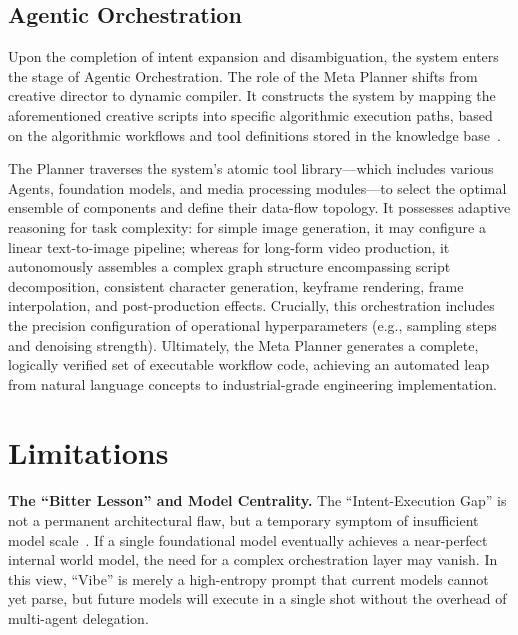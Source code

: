 \documentclass{article}
\begin{document}
\subsection{Agentic Orchestration}

Upon the completion of intent expansion and disambiguation, the system enters the stage of Agentic Orchestration. The role of the Meta Planner shifts from creative director to dynamic compiler. It constructs the system by mapping the aforementioned creative scripts into specific algorithmic execution paths, based on the algorithmic workflows and tool definitions stored in the knowledge base~\citep{li2024autoflowautomatedworkflowgeneration}.

The Planner traverses the system’s atomic tool library—which includes various Agents, foundation models, and media processing modules—to select the optimal ensemble of components and define their data-flow topology. It possesses adaptive reasoning for task complexity: for simple image generation, it may configure a linear text-to-image pipeline; whereas for long-form video production, it autonomously assembles a complex graph structure encompassing script decomposition, consistent character generation, keyframe rendering, frame interpolation, and post-production effects. Crucially, this orchestration includes the precision configuration of operational hyperparameters (e.g., sampling steps and denoising strength). Ultimately, the Meta Planner generates a complete, logically verified set of executable workflow code, achieving an automated leap from natural language concepts to industrial-grade engineering implementation.

\section{Limitations}
\label{views}

\noindent\textbf{The ``Bitter Lesson'' and Model Centrality.}
The ``Intent-Execution Gap'' is not a permanent architectural flaw, but a temporary symptom of insufficient model scale~\citep{sutton2019bitter}. If a single foundational model eventually achieves a near-perfect internal world model, the need for a complex orchestration layer may vanish. In this view, ``Vibe'' is merely a high-entropy prompt that current models cannot yet parse, but future models will execute in a single shot without the overhead of multi-agent delegation.
\end{document}
